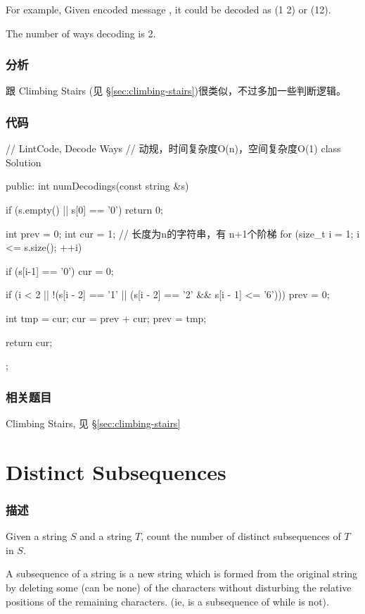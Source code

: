 For example,
Given encoded message , it could be decoded as  (1 2) or  (12).

The number of ways decoding  is 2.


\subsubsection{分析}
跟 Climbing Stairs (见 \S \ref{sec:climbing-stairs})很类似，不过多加一些判断逻辑。


\subsubsection{代码}
\begin{Code}
// LintCode, Decode Ways
// 动规，时间复杂度O(n)，空间复杂度O(1)
class Solution {
public:
    int numDecodings(const string &s) {
        if (s.empty() || s[0] == '0') return 0;

        int prev = 0;
        int cur = 1;
        // 长度为n的字符串，有 n+1个阶梯
        for (size_t i = 1; i <= s.size(); ++i) {
            if (s[i-1] == '0') cur = 0;

            if (i < 2 || !(s[i - 2] == '1' ||
                     (s[i - 2] == '2' && s[i - 1] <= '6')))
                prev = 0;

            int tmp = cur;
            cur = prev + cur;
            prev = tmp;
        }
        return cur;
    }
};
\end{Code}


\subsubsection{相关题目}
\begindot
\item Climbing Stairs, 见 \S \ref{sec:climbing-stairs}
\myenddot


\section{Distinct Subsequences} %
\label{sec:distinct-subsequences}


\subsubsection{描述}
Given a string $S$ and a string $T$, count the number of distinct subsequences of $T$ in $S$.

A subsequence of a string is a new string which is formed from the original string by deleting some (can be none) of the characters without disturbing the relative positions of the remaining characters. (ie,  is a subsequence of  while  is not).

